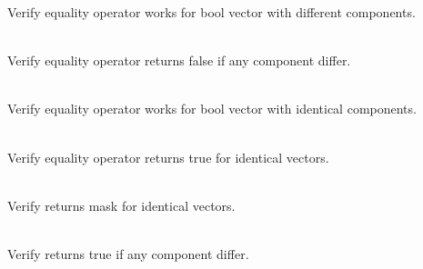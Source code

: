 \begin{DoxyRefList}
\label{test__test000079}%
%
Verify  equality operator works for bool vector with different components.  
\item[{\parbox[t]{\linewidth}{Member \doxylink{_equality_tests_8cpp_a150ab58eb607c8471f938de0f481bdfd}{Vector4\+DEquality\+\_\+\+Equality\+Operator\+\_\+\+Different\+Vectors\+Returns\+False} ()}}]\hfill \\
\label{test__test000077}%
%
Verify  equality operator returns false if any component differ.  
\item[{\parbox[t]{\linewidth}{Member \doxylink{_equality_tests_8cpp_ae2ebba909b2a66c0d76babaea309e85f}{Vector4\+DEquality\+\_\+\+Equality\+Operator\+\_\+\+Identical\+Boolean\+Vectors\+Returns\+True} ()}}]\hfill \\
\label{test__test000078}%
%
Verify  equality operator works for bool vector with identical components.  
\item[{\parbox[t]{\linewidth}{Member \doxylink{_equality_tests_8cpp_ad24ea6306dd300444cc2df9a6217ec65}{Vector4\+DEquality\+\_\+\+Equality\+Operator\+\_\+\+Identical\+Vectors\+Returns\+True} ()}}]\hfill \\
\label{test__test000074}%
%
Verify  equality operator returns true for identical vectors.  
\item[{\parbox[t]{\linewidth}{Member \doxylink{_equality_tests_8cpp_adc102a3254273681263584f60fd6bd5e}{Vector4\+DEquality\+\_\+\+Equality\+Returns\+Correct\+Boolean\+Mask} ()}}]\hfill \\
\label{test__test000080}%
%
Verify  returns  mask for identical vectors.  
\item[{\parbox[t]{\linewidth}{Member \doxylink{_equality_tests_8cpp_a898b970a2d22175575a255869d66cf32}{Vector4\+DEquality\+\_\+\+Inequality\+\_\+\+Different\+Vectors\+Returns\+True} ()}}]\hfill \\
\label{test__test000086}%
%
Verify  returns true if any component differ.  

\end{DoxyRefList}
